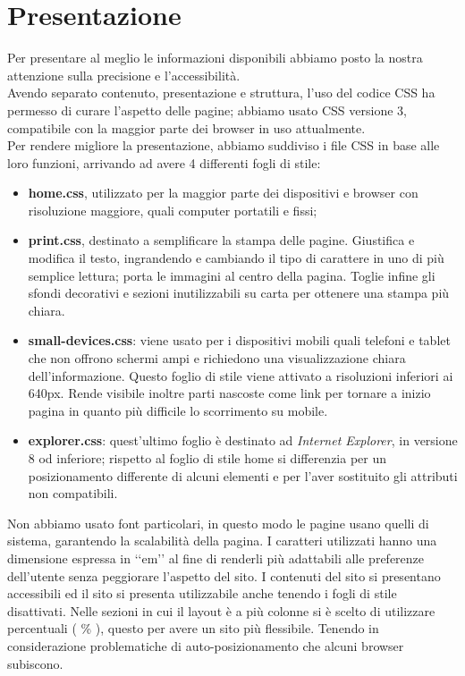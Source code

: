 \section{Presentazione}{
	Per presentare al meglio le informazioni disponibili abbiamo posto la nostra attenzione sulla precisione e l'accessibilità.\\
	Avendo separato contenuto, presentazione e struttura, l'uso del codice CSS ha permesso di curare l'aspetto delle pagine; abbiamo usato CSS versione 3, compatibile con la maggior parte dei browser in uso attualmente.\\
	Per rendere migliore la presentazione, abbiamo suddiviso i file CSS in base alle loro funzioni, arrivando ad avere 4 differenti fogli di stile:
	\begin{itemize}
		\item \textbf{home.css}, utilizzato per la maggior parte dei dispositivi e browser con risoluzione maggiore, quali computer portatili e fissi;
		\item \textbf{print.css}, destinato a semplificare la stampa delle pagine.
		Giustifica e modifica il testo, ingrandendo e cambiando il tipo di carattere in uno di più semplice lettura; porta le immagini al centro della pagina. Toglie infine gli sfondi decorativi e sezioni inutilizzabili su carta per ottenere una stampa più chiara.
		\item \textbf{small-devices.css}: viene usato per i dispositivi mobili quali telefoni e tablet che non offrono schermi ampi e richiedono una visualizzazione chiara dell'informazione. Questo foglio di stile viene attivato a risoluzioni inferiori ai 640px. Rende visibile inoltre parti nascoste come link per tornare a inizio pagina in quanto più difficile lo scorrimento su mobile.
		\item \textbf{explorer.css}: quest'ultimo foglio è destinato ad \textit{Internet Explorer}, in versione 8 od inferiore; rispetto al foglio di stile home si differenzia per un posizionamento differente di alcuni elementi e per l'aver sostituito gli attributi non compatibili.
	\end{itemize}
	Non abbiamo usato font particolari, in questo modo le pagine usano quelli di sistema, garantendo la scalabilità della pagina. I caratteri utilizzati hanno una dimensione espressa in ‘‘em’’ al fine di renderli più adattabili alle preferenze dell'utente senza peggiorare l'aspetto del sito.
	I contenuti del sito si presentano accessibili ed il sito si presenta utilizzabile anche tenendo i fogli di stile disattivati.
	Nelle sezioni in cui il layout è a più colonne si è scelto di utilizzare percentuali ( \% ), questo per avere un sito più flessibile. Tenendo in considerazione problematiche di auto-posizionamento che alcuni browser subiscono.
}
